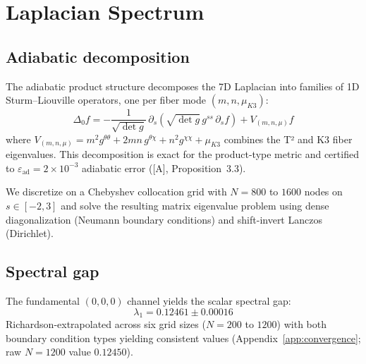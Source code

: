 \documentclass[11pt,a4paper]{article}
\begin{document}
\section{Laplacian Spectrum}\label{sec:laplacian}

\subsection{Adiabatic decomposition}

The adiabatic product structure decomposes the 7D Laplacian into families of 1D Sturm--Liouville operators, one per fiber mode $(m, n, \mu_{K3})$:
\begin{equation}
\Delta_0 f = -\frac{1}{\sqrt{\det g}}\, \partial_s \!\left( \sqrt{\det g}\, g^{ss}\, \partial_s f \right) + V_{(m,n,\mu)} f
\end{equation}
where $V_{(m,n,\mu)} = m^2 g^{\theta\theta} + 2mn\, g^{\theta\chi} + n^2 g^{\chi\chi} + \mu_{K3}$ combines the T² and K3 fiber eigenvalues. This decomposition is exact for the product-type metric and certified to $\varepsilon_{\mathrm{ad}} = 2 \times 10^{-3}$ adiabatic error ([A], Proposition~3.3).

We discretize on a Chebyshev collocation grid with $N = 800$ to $1600$ nodes on $s \in [-2, 3]$ and solve the resulting matrix eigenvalue problem using dense diagonalization (Neumann boundary conditions) and shift-invert Lanczos (Dirichlet).

\subsection{Spectral gap}

The fundamental $(0, 0, 0)$ channel yields the scalar spectral gap:
\begin{equation}\label{eq:lambda1}
\lambda_1 = 0.12461 \pm 0.00016
\end{equation}
Richardson-extrapolated across six grid sizes ($N = 200$ to $1200$) with both boundary condition types yielding consistent values (Appendix~\ref{app:convergence}; raw $N=1200$ value $0.12450$).
\end{document}
